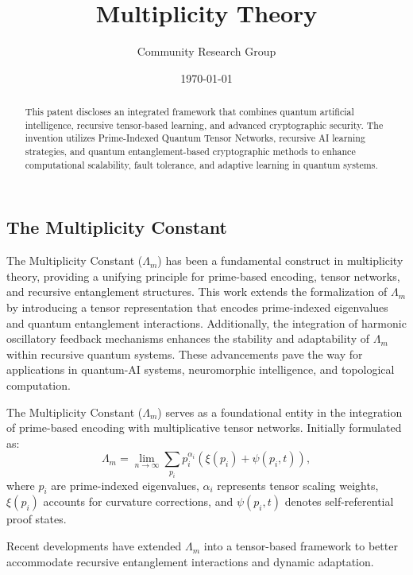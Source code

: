 \documentclass{article}
\theoremstyle{plain}
\begin{document}
\begin{itemize}
\section{The Multiplicity Constant}
The Multiplicity Constant ($\Lambda_m$) has been a fundamental construct in multiplicity theory, providing a unifying principle for prime-based encoding, tensor networks, and recursive entanglement structures. This work extends the formalization of $\Lambda_m$ by introducing a tensor representation that encodes prime-indexed eigenvalues and quantum entanglement interactions. Additionally, the integration of harmonic oscillatory feedback mechanisms enhances the stability and adaptability of $\Lambda_m$ within recursive quantum systems. These advancements pave the way for applications in quantum-AI systems, neuromorphic intelligence, and topological computation.

The Multiplicity Constant ($\Lambda_m$) serves as a foundational entity in the integration of prime-based encoding with multiplicative tensor networks. Initially formulated as:
\begin{equation}
    \Lambda_m = \lim_{n\to\infty} \sum_{p_i} p_i^{\alpha_i} \left( \xi(p_i) + \psi(p_i, t) \right),
\end{equation}
where $p_i$ are prime-indexed eigenvalues, $\alpha_i$ represents tensor scaling weights, $\xi(p_i)$ accounts for curvature corrections, and $\psi(p_i, t)$ denotes self-referential proof states.

Recent developments have extended $\Lambda_m$ into a tensor-based framework to better accommodate recursive entanglement interactions and dynamic adaptation.
\nocite{*}


\title{Multiplicity Theory}
\author{Community Research Group}
\date{\today}


\maketitle
\nolinenumbers
\begin{abstract}
This patent discloses an integrated framework that combines quantum artificial intelligence, recursive tensor-based learning, and advanced cryptographic security. The invention utilizes Prime-Indexed Quantum Tensor Networks, recursive AI learning strategies, and quantum entanglement-based cryptographic methods to enhance computational scalability, fault tolerance, and adaptive learning in quantum systems.


\end{abstract}
\end{itemize}
\end{document}
